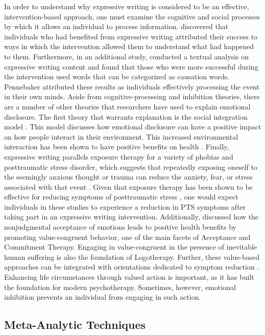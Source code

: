 \documentclass[english,man]{apa6}
\theoremstyle{definition}
\theoremstyle{definition}
\theoremstyle{definition}
\theoremstyle{remark}
\begin{document}
In order to understand why expressive writing is considered to be an
effective, intervention-based approach, one must examine the cognitive
and social processes by which it allows an individual to process
information. \textcite{Pennebaker1990} discovered that individuals who
had benefited from expressive writing attributed their success to ways
in which the intervention allowed them to understand what had happened
to them. Furthermore, in an additional study, \textcite{Pennebaker1993}
conducted a textual analysis on expressive writing content and found
that those who were more successful during the intervention used words
that can be categorized as causation words. Pennebaker attributed these
results as individuals effectively processing the event in their own
minds. Aside from cognitive-processing and inhibition theories, there
are a number of other theories that researchers have used to explain
emotional disclosure. The first theory that warrants explanation is the
social integration model \autocite{Pennebaker2001}. This model discusses
how emotional disclosure can have a positive impact on how people
interact in their environment. This increased environmental interaction
has been shown to have positive benefits on health
\autocite{Frattaroli2006}. Finally, expressive writing parallels
exposure therapy for a variety of phobias and posttraumatic stress
disorder, which suggests that repeatedly exposing oneself to the
seemingly anxious thought or trauma can reduce the anxiety, fear, or
stress associated with that event \autocite{Meshberg-Cohen2014}. Given
that exposure therapy has been shown to be effective for reducing
symptoms of posttraumatic stress \autocite[PTS;][]{Sloan2005}, one would
expect individuals in these studies to experience a reduction in PTS
symptoms after taking part in an expressive writing intervention.
Additionally, \textcite{Wilson2009} discussed how the nonjudgmental
acceptance of emotions leads to positive health benefits by promoting
value-congruent behavior, one of the main facets of Acceptance and
Commitment Therapy. Engaging in value-congruent in the presence of
inevitable human suffering is also the foundation of Logotherapy.
Further, these value-based approaches can be integrated with
orientations dedicated to symptom reduction
\autocites{Frankl1959}{Schulenberg2008}. Enhancing life circumstances
through valued action is important, as it has built the foundation for
modern psychotherapy. Sometimes, however, emotional inhibition prevents
an individual from engaging in such action.

\subsection{Meta-Analytic Techniques}\label{meta-analytic-techniques}
\end{document}

